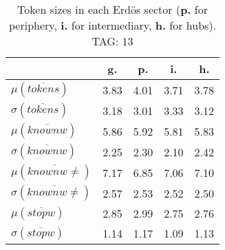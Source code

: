 \begin{table}[h!]
\begin{center}
\begin{tabular}{| l || c | c | c | c |}\hline
 & {\bf g.} & {\bf p.} & {\bf i.} & {\bf h.} \\\hline\hline
$\mu(\overline{tokens})$ & 3.83  & 4.01  & 3.71  & 3.78 \\
$\sigma(\overline{tokens})$ & 3.18  & 3.01  & 3.33  & 3.12 \\\hline
$\mu(\overline{knownw})$ & 5.86  & 5.92  & 5.81  & 5.83 \\
$\sigma(\overline{knownw})$ & 2.25  & 2.30  & 2.10  & 2.42 \\\hline
$\mu(\overline{knownw \neq})$ & 7.17  & 6.85  & 7.06  & 7.10 \\
$\sigma(\overline{knownw \neq})$ & 2.57  & 2.53  & 2.52  & 2.50 \\\hline
$\mu(\overline{stopw})$ & 2.85  & 2.99  & 2.75  & 2.76 \\
$\sigma(\overline{stopw})$ & 1.14  & 1.17  & 1.09  & 1.13 \\\hline
\end{tabular}
\caption{Token sizes in each Erd\"os sector ({{\bf p.}} for periphery, {{\bf i.}} for intermediary, {{\bf h.}} for hubs). TAG: 13}
\end{center}
\end{table}